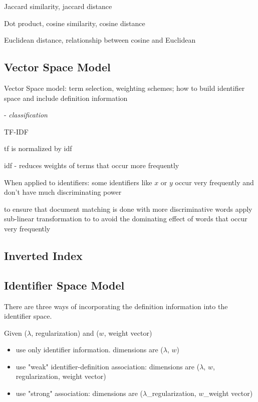 Jaccard similarity, jaccard distance

Dot product, cosine similarity, cosine distance

Euclidean distance, relationship between cosine and Euclidean



\subsection{Vector Space Model}

Vector Space model: term selection, weighting schemes; how to build identifier space and include definition information

\cite{sebastiani2002machine} - \emph{classification}



TF-IDF


tf is normalized by idf

idf - reduces weights of terms that occur more frequently

When applied to identifiers: some identifiers like $x$ or $y$ occur very frequently and don't have much discriminating power


to ensure that document matching is done with more discriminative words
apply sub-linear transformation to to avoid the dominating effect of words that occur very frequently

\subsection{Inverted Index} \label{sec:index}

\subsection{Identifier Space Model} \label{sec:ism}


There are three ways of incorporating the definition information into the identifier space.

Given ($\lambda$, regularization) and ($w$, weight vector)

\begin{itemize}
  \item use only identifier information. dimensions are ($\lambda$, $w$)
  \item use "weak" identifier-definition association:  dimensions are ($\lambda$, $w$, regularization, weight vector)
  \item use "strong" association:  dimensions are ($\lambda$\_regularization, $w$\_weight vector)
\end{itemize}


